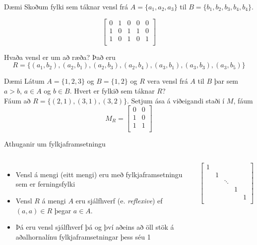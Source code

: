 \documentclass[handout]{beamer}
\begin{document}
\begin{frame}{Dæmi}
    Skoðum fylki sem táknar vensl frá $A= \{a_1, a_2, a_3\}$ til $B=\{b_1, b_2, b_3, b_4, b_4\}$.
    
    \[
        \begin{bmatrix}
            0&1&0&0&0\\
            1&0&1&1&0\\
            1&0&1&0&1\\
        \end{bmatrix}
    \]

    Hvaða vensl er um að ræða? \pause Það eru
    \[
        R = \{(a_1 , b_2 ), (a_2 , b_1 ), (a_2 , b_3 ), (a_2 , b_4 ), (a_3 , b_1 ), (a_3 , b_3 ), (a_3 , b_5 )\}        
    \]
\end{frame}

\begin{frame}{Dæmi}
Látum $A= \{1, 2, 3\}$ og $B = \{1, 2\}$ og $R$ vera vensl frá $A$ til $B$ þar sem $a > b$, $a \in A$ og $b \in B$. Hvert er fylkið sem táknar $R$?\\
\pause
Fáum að $R= \{(2, 1), (3, 1), (3, 2)\}$. Setjum ása á viðeigandi staði í $M$, fáum 
\[
 M_R =
\begin{bmatrix}
0 & 0\\
1 & 0\\
1 & 1\\
\end{bmatrix}
\]
\end{frame}

\begin{frame}{Athuganir um fylkjaframsetningu}
\begin{columns}
\begin{itemize}
 \item Vensl á mengi (eitt mengi) eru með fylkjaframsetningu sem er ferningsfylki
 \item Vensl $R$ á mengi $A$ eru sjálfhverf (e. \emph{reflexive}) ef $(a, a) \in R$ þegar $a \in A$.
 \item Þá eru vensl sjálfhverf þá og því aðeins að öll stök á aðalhornalínu fylkjaframsetningar þess séu 1
\end{itemize}
\[
\begin{bmatrix}
1&&&&\\
&1&&&\\
&&\ddots&&\\
&&&1&\\
&&&&1\\
\end{bmatrix}
\]  
\end{columns}
\end{frame}
\end{document}
